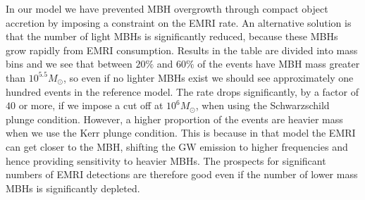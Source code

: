\documentclass[a4paper]{jpconf}
\begin{document}
In our model we have prevented MBH overgrowth through compact object accretion by imposing a constraint on the EMRI rate. An alternative solution is that the number of light MBHs is significantly reduced, because these MBHs grow rapidly from EMRI consumption. Results in the table are divided into mass bins and we see that between $20\%$ and $60\%$ of the events have MBH mass greater than $10^{5.5}M_\odot$, so even if no lighter MBHs exist we should see approximately one hundred events in the reference model. The rate drops significantly, by a factor of $40$ or more, if we impose a cut off at $10^6M_\odot$, when using the Schwarzschild plunge condition. However, a higher proportion of the events are heavier mass when we use the Kerr plunge condition. This is because in that model the EMRI can get closer to the MBH, shifting the GW emission to higher frequencies and hence providing sensitivity to heavier MBHs. The prospects for significant numbers of EMRI detections are therefore good even if the number of lower mass MBHs is significantly depleted.

\end{document}
